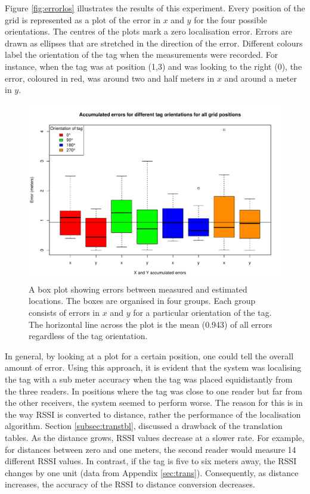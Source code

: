 Figure \ref{fig:errorlos} illustrates the results of this experiment. Every position of the grid is represented as a plot of the error in $x$ and $y$ for the four possible orientations. The centres of the plots mark a zero localisation error. Errors are drawn as ellipses that are stretched in the direction of the error. Different colours label the orientation of the tag when the measurements were recorded. For instance, when the tag was at position (1,3) and was looking to the right (0\textdegree), the error, coloured in red, was around two and half meters in $x$ and around a meter in $y$. 
\begin{figure}[H]
	\begin{center}
		\includegraphics[width=.8\textwidth]{figures/error_boxplot}
		\caption{A box plot showing errors between measured and estimated locations. The boxes are organised in four groups. Each group consists of errors in $x$ and $y$ for a particular orientation of the tag. The horizontal line across the plot is the mean (0.943) of all errors regardless of the tag orientation.}
		\label{fig:errorlosbox}
	\end{center}
\end{figure}

In general, by looking at a plot for a certain position, one could tell the overall amount of error. Using this approach, it is evident that the system was localising the tag with a sub meter accuracy when the tag was placed equidistantly from the three readers. In positions where the tag was close to one reader but far from the other receivers, the system seemed to perform worse. The reason for this is in the way RSSI is converted to distance, rather the performance of the localisation algorithm. Section \ref{subsec:transtbl}, discussed a drawback of the translation tables. As the distance grows, RSSI values decrease at a slower rate. For example, for distances between zero and one meters, the second reader would measure 14 different RSSI values. In contrast, if the tag is five to six meters away, the RSSI changes by one unit (data from Appendix \ref{sec:trans}). Consequently, as distance increases, the accuracy of the RSSI to distance conversion decreases.

